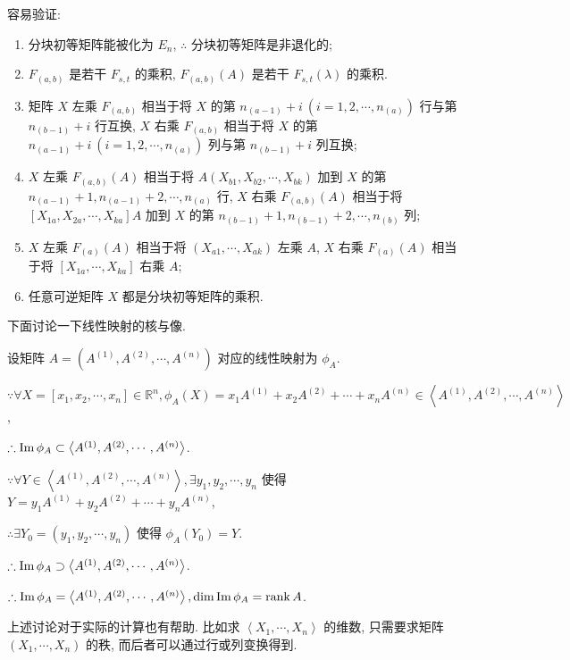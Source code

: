 \documentclass{ctexart}
\begin{document}
容易验证:
\begin{theorem}
    \begin{enumerate}
        \def\labelenumi{(\arabic{enumi})}
        \item 分块初等矩阵能被化为 $E_n$, $\therefore$ 分块初等矩阵是非退化的;
        \item $F_{(a,b)}$ 是若干 $F_{s,t}$ 的乘积, $F_{(a,b)}(A)$ 是若干 $F_{s,t}(\lambda)$ 的乘积.
        \item 矩阵 $X$ 左乘 $F_{(a,b)}$ 相当于将 $X$ 的第 $n_{(a-1)}+i\ (i=1,2,\cdots,n_{(a)})$ 行与第 $n_{(b-1)}+i$ 行互换, $X$ 右乘 $F_{(a,b)}$ 相当于将 $X$ 的第 $n_{(a-1)}+i\ (i=1,2,\cdots,n_{(a)})$ 列与第 $n_{(b-1)}+i$ 列互换;
        \item $X$ 左乘 $F_{(a,b)}(A)$ 相当于将 $A(X_{b1},X_{b2},\cdots,X_{bk})$ 加到 $X$ 的第 $n_{(a-1)}+1,n_{(a-1)}+2,\cdots,n_{(a)}$ 行, $X$ 右乘 $F_{(a,b)}(A)$ 相当于将 $[X_{1a},X_{2a},\cdots,X_{ka}]A$ 加到 $X$ 的第 $n_{(b-1)}+1,n_{(b-1)}+2,\cdots,n_{(b)}$ 列;
        \item $X$ 左乘 $F_{(a)}(A)$ 相当于将 $(X_{a1},\cdots,X_{ak})$ 左乘 $A$, $X$ 右乘 $F_{(a)}(A)$ 相当于将 $[X_{1a},\cdots,X_{ka}]$ 右乘 $A$;
        \item 任意可逆矩阵 $X$ 都是分块初等矩阵的乘积.
    \end{enumerate}
\end{theorem}

下面讨论一下线性映射的核与像.

设矩阵 $A=(A^{(1)},A^{(2)},\cdots,A^{(n)})$ 对应的线性映射为 $\phi_A$.

$\because\forall X=[x_1,x_2,\cdots,x_n]\in\mathbb{R}^n,\phi_A(X)=x_1A^{(1)}+x_2A^{(2)}+\cdots+x_nA^{(n)}\in\left<A^{(1)},A^{(2)},\cdots,A^{(n)}\right>$,

$\therefore\operatorname{Im} \phi_A\subset\left<A^{(1)},A^{(2)},\cdots,A^{(n)}\right>$.

$\because\forall Y\in\left<A^{(1)},A^{(2)},\cdots,A^{(n)}\right>,\exists y_1,y_2,\cdots,y_n$ 使得 $Y=y_1A^{(1)}+y_2A^{(2)}+\cdots+y_nA^{(n)}$,

$\therefore\exists Y_0=(y_1,y_2,\cdots,y_n)$ 使得 $\phi_A(Y_0)=Y$.

$\therefore\operatorname{Im} \phi_A\supset\left<A^{(1)},A^{(2)},\cdots,A^{(n)}\right>$.

$\therefore\operatorname{Im} \phi_A=\left<A^{(1)},A^{(2)},\cdots,A^{(n)}\right>,\dim\operatorname{Im} \phi_A=\operatorname{rank} A$.

上述讨论对于实际的计算也有帮助. 比如求 $\left<X_1,\cdots,X_n\right>$ 的维数, 只需要求矩阵 $(X_1,\cdots,X_n)$ 的秩, 而后者可以通过行或列变换得到.
\end{document}

